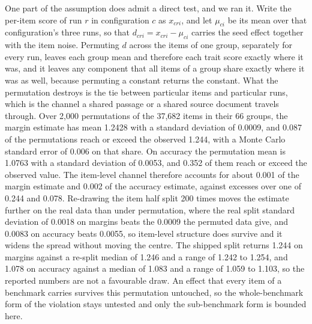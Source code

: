 One part of the assumption does admit a direct test, and we ran it. Write the per-item score of run $r$ in configuration $c$ as $x_{cri}$, and let $\mu_{ci}$ be its mean over that configuration's three runs, so that $d_{cri}=x_{cri}-\mu_{ci}$ carries the seed effect together with the item noise. Permuting $d$ across the items of one group, separately for every run, leaves each group mean and therefore each trait score exactly where it was, and it leaves any component that all items of a group share exactly where it was as well, because permuting a constant returns the constant. What the permutation destroys is the tie between particular items and particular runs, which is the channel a shared passage or a shared source document travels through. Over 2,000 permutations of the 37,682 items in their 66 groups, the margin estimate has mean 1.2428 with a standard deviation of 0.0009, and 0.087 of the permutations reach or exceed the observed 1.244, with a Monte Carlo standard error of 0.006 on that share. On accuracy the permutation mean is 1.0763 with a standard deviation of 0.0053, and 0.352 of them reach or exceed the observed value. The item-level channel therefore accounts for about 0.001 of the margin estimate and 0.002 of the accuracy estimate, against excesses over one of 0.244 and 0.078. Re-drawing the item half split 200 times moves the estimate further on the real data than under permutation, where the real split standard deviation of 0.0018 on margins beats the 0.0009 the permuted data give, and 0.0083 on accuracy beats 0.0055, so item-level structure does survive and it widens the spread without moving the centre. The shipped split returns 1.244 on margins against a re-split median of 1.246 and a range of 1.242 to 1.254, and 1.078 on accuracy against a median of 1.083 and a range of 1.059 to 1.103, so the reported numbers are not a favourable draw. An effect that every item of a benchmark carries survives this permutation untouched, so the whole-benchmark form of the violation stays untested and only the sub-benchmark form is bounded here.

